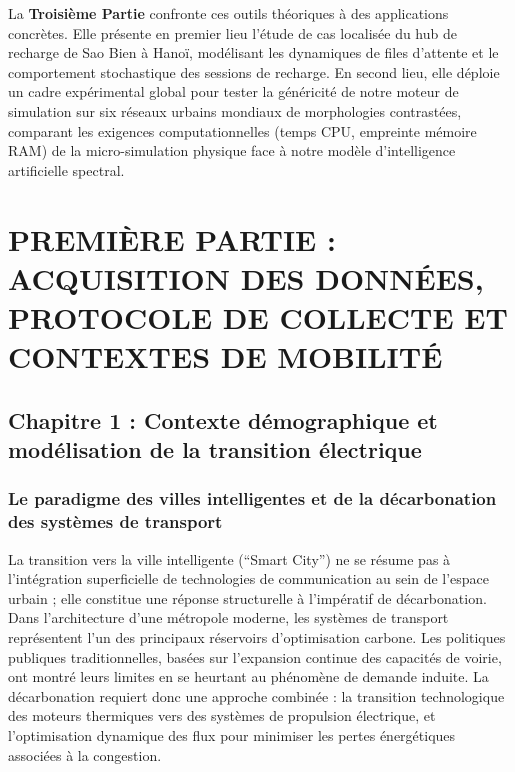 \documentclass[10pt, a4paper]{article}
\begin{document}
La \textbf{Troisième Partie} confronte ces outils théoriques à des
applications concrètes. Elle présente en premier lieu l'étude de cas
localisée du hub de recharge de Sao Bien à Hanoï, modélisant les
dynamiques de files d'attente et le comportement stochastique des
sessions de recharge. En second lieu, elle déploie un cadre expérimental
global pour tester la généricité de notre moteur de simulation sur six
réseaux urbains mondiaux de morphologies contrastées, comparant les
exigences computationnelles (temps CPU, empreinte mémoire RAM) de la
micro-simulation physique face à notre modèle d'intelligence
artificielle spectral.

\newpage

\section{PREMIÈRE PARTIE : ACQUISITION DES DONNÉES, PROTOCOLE DE
COLLECTE ET CONTEXTES DE
MOBILITÉ}\label{premiuxe8re-partie-acquisition-des-donnuxe9es-protocole-de-collecte-et-contextes-de-mobilituxe9}

\subsection{Chapitre 1 : Contexte démographique et modélisation de la
transition
électrique}\label{chapitre-1-contexte-duxe9mographique-et-moduxe9lisation-de-la-transition-uxe9lectrique}

\subsubsection{Le paradigme des villes intelligentes et de la
décarbonation des systèmes de
transport}\label{le-paradigme-des-villes-intelligentes-et-de-la-duxe9carbonation-des-systuxe8mes-de-transport}

La transition vers la ville intelligente (``Smart City'') ne se résume
pas à l'intégration superficielle de technologies de communication au
sein de l'espace urbain ; elle constitue une réponse structurelle à
l'impératif de décarbonation. Dans l'architecture d'une métropole
moderne, les systèmes de transport représentent l'un des principaux
réservoirs d'optimisation carbone. Les politiques publiques
traditionnelles, basées sur l'expansion continue des capacités de
voirie, ont montré leurs limites en se heurtant au phénomène de demande
induite. La décarbonation requiert donc une approche combinée : la
transition technologique des moteurs thermiques vers des systèmes de
propulsion électrique, et l'optimisation dynamique des flux pour
minimiser les pertes énergétiques associées à la congestion.
\end{document}
